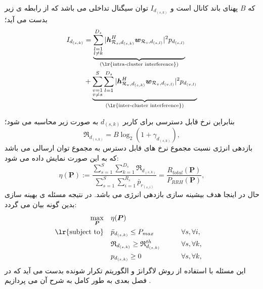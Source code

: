 که $B$ پهنای باند کانال است و 
$I_{d_{(s,k)}}$
توان سیگنال تداخلی می باشد که از رابطه ی زیر بدست می آید؛
\begin{equation}\label{6}
\begin{split}
I_{d_{(s,k)}} &=  \underbrace{\sum_{\substack{l=1 \\ l\neq k}}^{{D}_s} |\boldsymbol{h}_{\mathcal{R}_s, d_{(s,k)}}^H \boldsymbol{w}_{\mathcal{R}_{s},d_{(s,l)}}|^2  p_{d_{(s,l)}}}_{\text{(\lr{intra-cluster interference})}}\\
&+\underbrace{\sum_{\substack{v=1 \\ v\neq s}}^{S} \sum_{l=1}^{{D}_s} |\boldsymbol{h}_{\mathcal{R}_v, d_{(s,k)}}^H \boldsymbol{w}_{\mathcal{R}_{v},d_{(v,l)}}|^2 p_{d_{(v,l)}}}_{\text{(\lr{inter-cluster interference})}}\\
\end{split}
\end{equation}

بنابراین نرخ قابل دسترسی برای کاربر $d_{(s,k)}$ به صورت زیر محاسبه می شود؛
\begin{equation}\label{e1}
\mathfrak{R}_{d_{(s,k)}} = B \log_2(1+\gamma_{d_{(s,k)}}),
\end{equation}
بازدهی انرژی نسبت مجموع نرخ های قابل دسترس به مجموع توان ارسالی می باشد که به این صورت نمایش داده می شود:
\begin{equation}\label{eta}
\eta(\boldsymbol{P}) := \frac{\sum\limits_{s=1}^{S} \sum\limits_{k=1}^{{D}_s}\mathfrak{R}_{d_{(s,k)}} }{\sum\limits_{s=1}^{S} \sum\limits_{i=1}^{{R}_s}\bar{p}_{r_{(s,i)}}} = \frac{R_{total}(\boldsymbol{P})}{P_{RRH}(\boldsymbol{P})},
\end{equation}
حال در اینجا هدف بیشینه سازی بازدهی انرژی می باشد. در نتیجه مسئله ی بهینه سازی بدین گونه بیان می گردد:
   \begin{equation}\label{p12}
\begin{aligned}
\max\limits_{\boldsymbol{P}}   \quad &   \eta(\boldsymbol{P})\\
\text{\lr{subject to}} \quad  & \bar{p}_{d_{(s,k)}} \leq P_{max} && \qquad \forall s, \forall i,   \\
&\mathfrak{R}_{d_{(s,k)}} \geq  \mathfrak{R}_{d_{(s,k)}}^{th} && \qquad \forall s, \forall k, \\
&p_{d_{(s,k)}}  \geq 0                                  &&\qquad \forall s, \forall k, \\
\end{aligned}			
\end{equation}  
این مسئله با استفاده از روش لاگرانژ و الگوریتم تکرار شونده بدست می آید که در فصل بعدی به طور کامل به شرح آن می پردازیم \cite{cellfree,TDD,EEcluster}.
